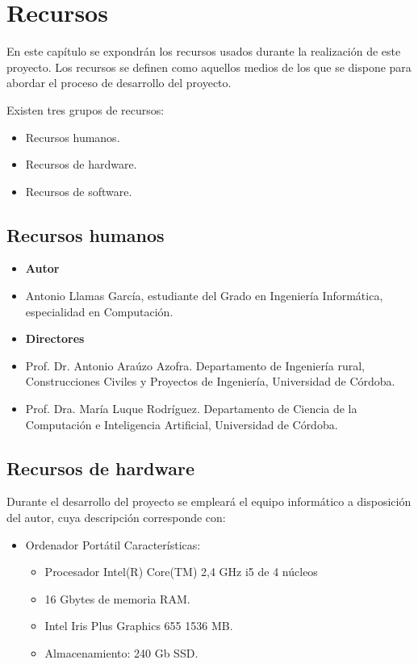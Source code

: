 \chapter{Recursos}

En este capítulo se expondrán los recursos usados durante la realización de este proyecto. Los recursos se definen como aquellos medios de los que se dispone para abordar el proceso de desarrollo del proyecto.

Existen tres grupos de recursos:

 \begin{itemize}
     \item Recursos humanos.
     \item Recursos de hardware.
     \item Recursos de software.
 \end{itemize}


 \section{Recursos humanos}
 \begin{itemize}
     \item \textbf{Autor}
     \item[] Antonio Llamas García, estudiante del Grado en Ingeniería Informática, especialidad en Computación.
    
     \item \textbf{Directores}
     \item[] Prof. Dr. Antonio Araúzo Azofra. Departamento de Ingeniería rural, Construcciones Civiles y Proyectos de Ingeniería, Universidad de Córdoba.
     \item[] Prof. Dra. María Luque Rodríguez. Departamento de Ciencia de la Computación e Inteligencia Artificial, Universidad de Córdoba.
 \end{itemize}

\section{Recursos de hardware}
 Durante el desarrollo del proyecto se empleará el equipo informático a disposición del autor, cuya descripción corresponde con:
  \begin{itemize}
      \item Ordenador Portátil Características:
      \begin{itemize}
         \item Procesador Intel(R) Core(TM) 2,4 GHz i5 de 4 núcleos
         \item 16 Gbytes de memoria RAM.
         \item Intel Iris Plus Graphics 655 1536 MB.
         \item Almacenamiento: 240 Gb SSD.
      \end{itemize}
  \end{itemize}

